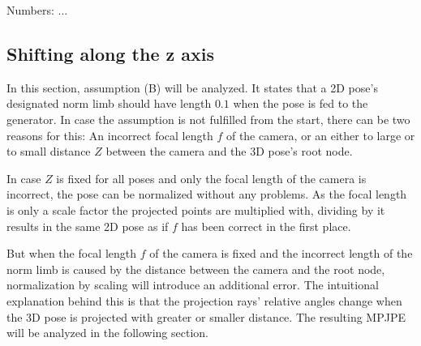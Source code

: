Numbers: ...
	
\subsection{Shifting along the z axis}
\label{sec:z-shift-error}

In this section, assumption (B) will be analyzed.
It states that a 2D pose's designated norm limb should have length $0.1$ when the pose is fed to the generator.
In case the assumption is not fulfilled from the start, there can be two reasons for this: 
An incorrect focal length $f$ of the camera, or an either to large or to small distance $Z$ between the camera and the 3D pose's root node.

In case $Z$ is fixed for all poses and only the focal length of the camera is incorrect, the pose can be normalized without any problems.
As the focal length is only a scale factor the projected points are multiplied with, dividing by it results in the same 2D pose as if $f$ has been correct in the first place.

But when the focal length $f$ of the camera is fixed and the incorrect length of the norm limb is caused by the distance between the camera and the root node, normalization by scaling will introduce an additional error.
The intuitional explanation behind this is that the projection rays' relative angles change when the 3D pose is projected with greater or smaller distance.
The resulting MPJPE will be analyzed in the following section.

